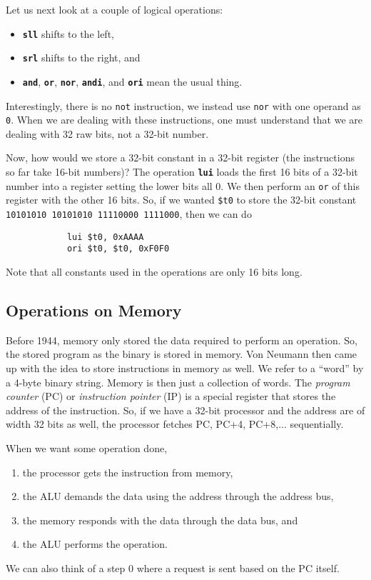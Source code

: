 \documentclass{article}
\begin{document}
		Let us next look at a couple of logical operations:
		\begin{itemize}
			\item \textbf{\texttt{sll}} shifts to the left,
			\item \textbf{\texttt{srl}} shifts to the right, and
			\item \textbf{\texttt{and}}, \textbf{\texttt{or}}, \textbf{\texttt{nor}}, \textbf{\texttt{andi}}, and \textbf{\texttt{ori}} mean the usual thing.
		\end{itemize}
		Interestingly, there is no \texttt{not} instruction, we instead use \texttt{nor} with one operand as \texttt{0}. When we are dealing with these instructions, one must understand that we are dealing with 32 raw bits, not a 32-bit number. 

		Now, how would we store a 32-bit constant in a 32-bit register (the instructions so far take 16-bit numbers)? The operation \textbf{\texttt{lui}} loads the first 16 bits of a 32-bit number into a register setting the lower bits all 0. We then perform an \texttt{or} of this register with the other 16 bits. So, if we wanted \texttt{\$t0} to store the 32-bit constant \texttt{10101010 10101010 11110000 1111000}, then we can do
		\begin{verbatim}
			lui $t0, 0xAAAA
			ori $t0, $t0, 0xF0F0
		\end{verbatim}
		Note that all constants used in the operations are only 16 bits long.

	\subsection{Operations on Memory}

		Before 1944, memory only stored the data required to perform an operation. So, the stored program as the binary is stored in memory. Von Neumann then came up with the idea to store instructions in memory as well. We refer to a ``word'' by a 4-byte binary string. Memory is then just a collection of words. The \textit{program counter} (PC) or \textit{instruction pointer} (IP) is a special register that stores the address of the instruction. So, if we have a 32-bit processor and the address are of width 32 bits as well, the processor fetches PC, PC+4, PC+8,$\ldots$ sequentially.

		When we want some operation done,
		\begin{enumerate}
			\item the processor gets the instruction from memory,
			\item the ALU demands the data using the address through the address bus,
			\item the memory responds with the data through the data bus, and
			\item the ALU performs the operation.
		\end{enumerate}
		We can also think of a step 0 where a request is sent based on the PC itself.
\end{document}
